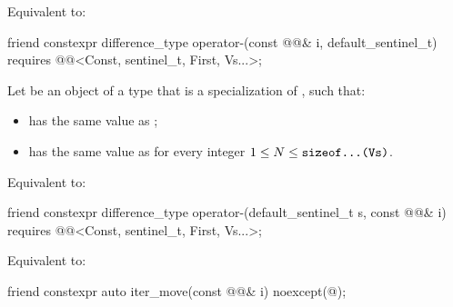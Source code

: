 \begin{itemdescr}
\pnum
\effects
Equivalent to: 
\end{itemdescr}

%
\begin{itemdecl}
friend constexpr difference_type operator-(const @@& i, default_sentinel_t)
  requires @@<Const, sentinel_t, First, Vs...>;
\end{itemdecl}

\begin{itemdescr}
\pnum
Let  be an object of a type
that is a specialization of , such that:
\begin{itemize}
\item
{} has the same value as
;
\item
{} has the same value as
for every integer $1 \le N \le \tcode{sizeof...(Vs)}$.
\end{itemize}

\pnum
\effects
Equivalent to: 
\end{itemdescr}

%
\begin{itemdecl}
friend constexpr difference_type operator-(default_sentinel_t s, const @@& i)
  requires @@<Const, sentinel_t, First, Vs...>;
\end{itemdecl}

\begin{itemdescr}
\pnum
\effects
Equivalent to: 
\end{itemdescr}

%
\begin{itemdecl}
friend constexpr auto iter_move(const @@& i) noexcept(@\seebelow@);
\end{itemdecl}

